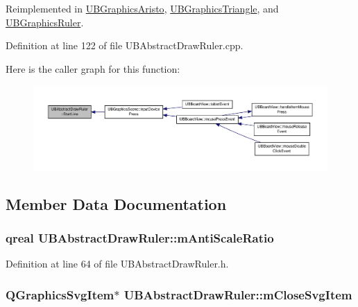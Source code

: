 Reimplemented in \hyperlink{class_u_b_graphics_aristo_a6c1672fb375f65509b15f964ea5b709e}{U\-B\-Graphics\-Aristo}, \hyperlink{class_u_b_graphics_triangle_abe0cc44d86ce8bc6351d18e2d823dfaa}{U\-B\-Graphics\-Triangle}, and \hyperlink{class_u_b_graphics_ruler_a8be968219769cc2fa025bbdf50c044d6}{U\-B\-Graphics\-Ruler}.



Definition at line 122 of file U\-B\-Abstract\-Draw\-Ruler.\-cpp.



Here is the caller graph for this function\-:
\nopagebreak
\begin{figure}[H]
\begin{center}
\leavevmode
\includegraphics[width=350pt]{d0/de1/class_u_b_abstract_draw_ruler_a62b7651d1eed188e2160343d078a837c_icgraph}
\end{center}
\end{figure}




\subsection{Member Data Documentation}
\hypertarget{class_u_b_abstract_draw_ruler_a92f48d4cf11861335075d27f297bdb44}{
\subsubsection[{m\-Anti\-Scale\-Ratio}]{\setlength{\rightskip}{0pt plus 5cm}qreal U\-B\-Abstract\-Draw\-Ruler\-::m\-Anti\-Scale\-Ratio\hspace{0.3cm}{\ttfamily [protected]}}}\label{d0/de1/class_u_b_abstract_draw_ruler_a92f48d4cf11861335075d27f297bdb44}


Definition at line 64 of file U\-B\-Abstract\-Draw\-Ruler.\-h.

\hypertarget{class_u_b_abstract_draw_ruler_a72b3fd06a1ed5dd3facd96ba93639398}{
\subsubsection[{m\-Close\-Svg\-Item}]{\setlength{\rightskip}{0pt plus 5cm}Q\-Graphics\-Svg\-Item$\ast$ U\-B\-Abstract\-Draw\-Ruler\-::m\-Close\-Svg\-Item\hspace{0.3cm}{\ttfamily [protected]}}}\label{d0/de1/class_u_b_abstract_draw_ruler_a72b3fd06a1ed5dd3facd96ba93639398}


